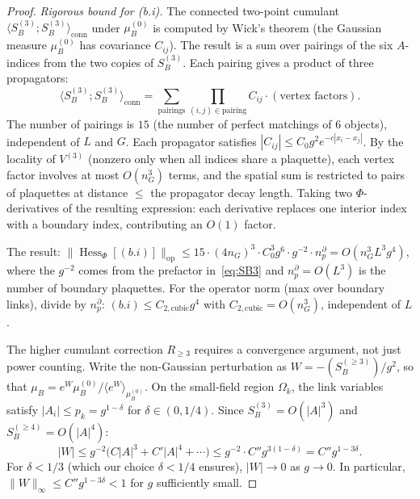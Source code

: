 \documentclass[11pt,a4paper]{article}
\theoremstyle{plain}
\theoremstyle{definition}
\theoremstyle{remark}
\newcommand{\Hess}{\operatorname{Hess}}
\begin{document}
\begin{proof}
\emph{Rigorous bound for (b.i).}
The connected two-point cumulant
$\langle S_B^{(3)}; S_B^{(3)}\rangle_{\mathrm{conn}}$
under $\mu_B^{(0)}$ is computed by Wick's theorem
(the Gaussian measure $\mu_B^{(0)}$ has covariance
$C_{ij}$). The result is a sum over pairings of the
six $A$-indices from the two copies of $S_B^{(3)}$.
Each pairing gives a product of three propagators:
\begin{equation}
  \langle S_B^{(3)}; S_B^{(3)} \rangle_{\mathrm{conn}}
  = \sum_{\text{pairings}} \prod_{(i,j) \in \text{pairing}}
  C_{i j} \cdot (\text{vertex factors}).
\end{equation}
The number of pairings is $15$ (the number of perfect
matchings of 6 objects), independent of $L$ and $G$.
Each propagator satisfies
$|C_{ij}| \le C_0 g^2 e^{-c|x_i - x_j|}$.
By the locality of $V^{(3)}$ (nonzero only when all
indices share a plaquette), each vertex factor involves
at most $O(n_G^3)$ terms, and the spatial sum is
restricted to pairs of plaquettes at distance $\le$
the propagator decay length. Taking two
$\Phi$-derivatives of the resulting expression:
each derivative replaces one interior index with a
boundary index, contributing an $O(1)$ factor.

The result: $\|\Hess_\Phi[(b.i)]\|_{\mathrm{op}}
\le 15 \cdot (4n_G)^3 \cdot C_0^3 g^6 \cdot g^{-2}
\cdot n_p^\partial = O(n_G^3 L^3 g^4)$,
where the $g^{-2}$ comes from the prefactor
in~\eqref{eq:SB3} and $n_p^\partial = O(L^3)$
is the number of boundary plaquettes.
For the operator norm (max over boundary links),
divide by $n_p^\partial$:
$(b.i) \le C_{2,\mathrm{cubic}} g^4$
with $C_{2,\mathrm{cubic}} = O(n_G^3)$, independent
of $L$.

The higher cumulant correction $R_{\ge 3}$ requires
a convergence argument, not just power counting.
Write the non-Gaussian perturbation as
$W = -(S_B^{(\ge 3)})/g^2$, so that
$\mu_B = e^W \mu_B^{(0)} / \langle e^W \rangle_{\mu_B^{(0)}}$.
On the small-field region $\Omega_k$, the link
variables satisfy $|A_i| \le p_k = g^{1-\delta}$
for $\delta \in (0, 1/4)$. Since $S_B^{(3)} = O(|A|^3)$
and $S_B^{(\ge 4)} = O(|A|^4)$:
\begin{equation}
  |W| \le g^{-2}\bigl(C|A|^3 + C'|A|^4 + \cdots\bigr)
  \le g^{-2} \cdot C'' g^{3(1-\delta)}
  = C'' g^{1-3\delta}.
\end{equation}
For $\delta < 1/3$ (which our choice $\delta < 1/4$
ensures), $|W| \to 0$ as $g \to 0$. In particular,
$\|W\|_\infty \le C'' g^{1-3\delta} < 1$ for $g$
sufficiently small.


\end{proof}
\end{document}
